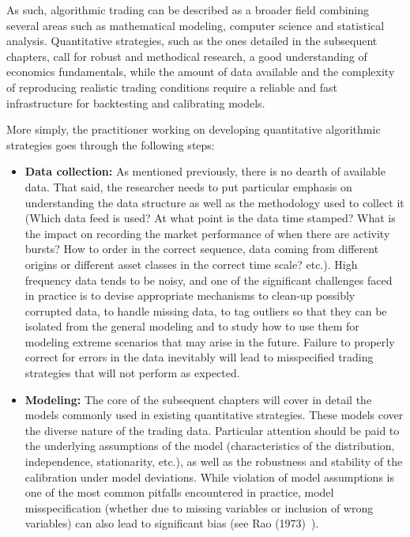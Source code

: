 As such, algorithmic trading can be described as a broader field combining several areas such as mathematical modeling, computer science and statistical analysis. Quantitative strategies, such as the ones detailed in the subsequent chapters, call for robust and methodical research, a good understanding of economics fundamentals, while the amount of data available and the complexity of reproducing realistic trading conditions require a reliable and fast infrastructure for backtesting and calibrating models.


More simply, the practitioner working on developing quantitative algorithmic strategies goes through the following steps:
\begin{itemize}
\item \textbf{Data collection:} As mentioned previously, there is no dearth of available data. That said, the researcher needs to put particular emphasis on understanding the data structure as well as the methodology used to collect it (Which data feed is used? At what point is the data time stamped? What is the impact on recording the market performance of when there are activity bursts? How to order in the correct sequence, data coming from different origins or different asset classes in the correct time scale? etc.). High frequency data tends to be noisy, and one of the significant challenges faced in practice is to devise appropriate mechanisms to clean-up possibly corrupted data, to handle missing data, to tag outliers so that they can be isolated from the general modeling and to study how to use them for modeling extreme scenarios that may arise in the future. Failure to properly correct for errors in the data inevitably will lead to misspecified trading strategies that will not perform as expected.

\item \textbf{Modeling:} The core of the subsequent chapters will cover in detail the models commonly used in existing quantitative strategies. These models cover the diverse nature of the trading data.  Particular attention should be paid to the underlying assumptions of the model (characteristics of the distribution, independence, stationarity, etc.), as well as the robustness and stability of the calibration under model deviations. While violation of model assumptions is one of the most common pitfalls encountered in practice, model misspecification (whether due to missing variables or inclusion of wrong variables) can also lead to significant bias (see Rao (1973)~\cite{rao1973}). 


\end{itemize}
